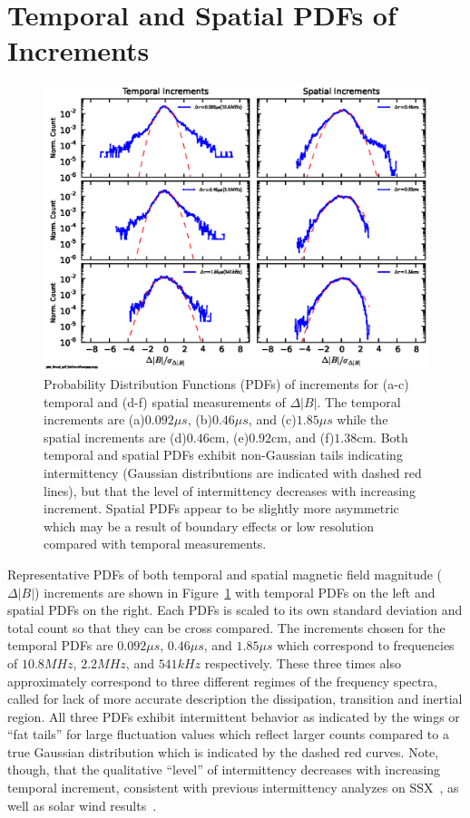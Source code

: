 \documentclass[preprint2]{aastex}
\begin{document}
\section{Temporal and Spatial PDFs of Increments}\label{sec:pdfs}

\begin{figure}
\includegraphics{fig1.eps}
\caption{\label{fig:pdfs}Probability Distribution Functions (PDFs) of increments for (a-c) temporal and (d-f) spatial measurements of $\Delta |B|$. The temporal increments are (a)$0.092\mu s$, (b)$0.46\mu s$, and (c)$1.85\mu s$ while the spatial increments are (d)$0.46$cm, (e)$0.92$cm, and (f)$1.38$cm. Both temporal and spatial PDFs exhibit non-Gaussian tails indicating intermittency (Gaussian distributions are indicated with dashed red lines), but that the level of intermittency decreases with increasing increment. Spatial PDFs appear to be slightly more asymmetric which may be a result of boundary effects or low resolution compared with temporal measurements.}
\end{figure}

Representative PDFs of both temporal and spatial magnetic field magnitude ($\Delta |B|$) increments are shown in Figure~\ref{fig:pdfs} with temporal PDFs on the left and spatial PDFs on the right. Each PDFs is scaled to its own standard deviation and total count so that they can be cross compared. The increments chosen for the temporal PDFs are $0.092\mu s$, $0.46\mu s$, and $1.85\mu s$ which correspond to frequencies of $10.8MHz$, $2.2MHz$, and $541kHz$ respectively. These three times also approximately correspond to three different regimes of the frequency spectra, called for lack of more accurate description the dissipation, transition and inertial region. All three PDFs exhibit intermittent behavior as indicated by the wings or ``fat tails'' for large fluctuation values which reflect larger counts compared to a true Gaussian distribution which is indicated by the dashed red curves. Note, though, that the qualitative ``level'' of intermittency decreases with increasing temporal increment, consistent with previous intermittency analyzes on SSX~\citep{schaffner2014a,schaffner2014b}, as well as solar wind results~\citep{bruno2013}.
\end{document}
